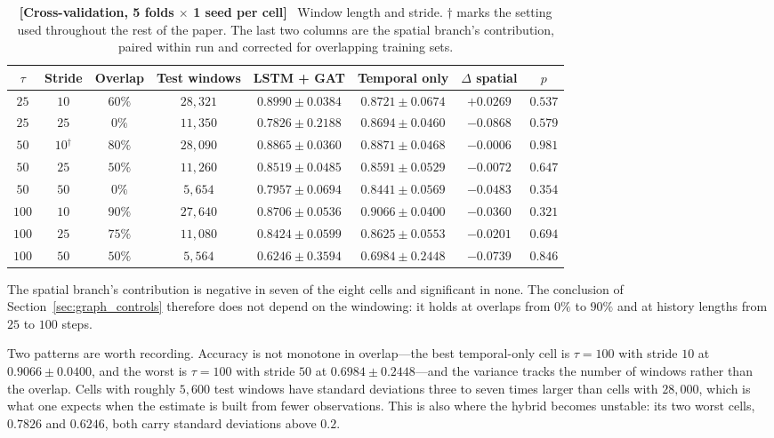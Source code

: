 \documentclass[journal]{IEEEtran}
\begin{document}
\begin{table}[!t]
  \centering
  \caption{\textbf{[Cross-validation, 5 folds $\times$ 1 seed per cell]}~
  Window length and stride. $\dagger$ marks the setting used throughout the
  rest of the paper. The last two columns are the spatial branch's
  contribution, paired within run and corrected for overlapping training sets.}
  \label{tab:window_stride}
  \renewcommand{\arraystretch}{1.2}
  \footnotesize
  \setlength{\tabcolsep}{4pt}
  \begin{tabular}{@{}cccccccc@{}}
    \toprule
    $\tau$ & \textbf{Stride} & \textbf{Overlap} & \textbf{Test windows}
    & \textbf{LSTM + GAT} & \textbf{Temporal only}
    & \textbf{$\Delta$ spatial} & \textbf{$p$} \\ \midrule
    $25$ & $10$ & $60\%$ & $28{,}321$ & $0.8990 \pm 0.0384$ & $0.8721 \pm 0.0674$ & $+0.0269$ & $0.537$ \\
    $25$ & $25$ & $0\%$ & $11{,}350$ & $0.7826 \pm 0.2188$ & $0.8694 \pm 0.0460$ & $-0.0868$ & $0.579$ \\
    $50$ & $10$$^{\dagger}$ & $80\%$ & $28{,}090$ & $0.8865 \pm 0.0360$ & $0.8871 \pm 0.0468$ & $-0.0006$ & $0.981$ \\
    $50$ & $25$ & $50\%$ & $11{,}260$ & $0.8519 \pm 0.0485$ & $0.8591 \pm 0.0529$ & $-0.0072$ & $0.647$ \\
    $50$ & $50$ & $0\%$ & $5{,}654$ & $0.7957 \pm 0.0694$ & $0.8441 \pm 0.0569$ & $-0.0483$ & $0.354$ \\
    $100$ & $10$ & $90\%$ & $27{,}640$ & $0.8706 \pm 0.0536$ & $0.9066 \pm 0.0400$ & $-0.0360$ & $0.321$ \\
    $100$ & $25$ & $75\%$ & $11{,}080$ & $0.8424 \pm 0.0599$ & $0.8625 \pm 0.0553$ & $-0.0201$ & $0.694$ \\
    $100$ & $50$ & $50\%$ & $5{,}564$ & $0.6246 \pm 0.3594$ & $0.6984 \pm 0.2448$ & $-0.0739$ & $0.846$ \\
    \bottomrule
  \end{tabular}
\end{table}

The spatial branch's contribution is negative in seven of the eight cells and
significant in none. The conclusion of Section~\ref{sec:graph_controls}
therefore does not depend on the windowing: it holds at overlaps from $0\%$ to
$90\%$ and at history lengths from $25$ to $100$ steps.

Two patterns are worth recording. Accuracy is not monotone in overlap---the
best temporal-only cell is $\tau = 100$ with stride $10$ at
$0.9066 \pm 0.0400$, and the worst is $\tau = 100$ with stride $50$ at
$0.6984 \pm 0.2448$---and the variance tracks the number of windows rather
than the overlap. Cells with roughly $5{,}600$ test windows have standard
deviations three to seven times larger than cells with $28{,}000$, which is
what one expects when the estimate is built from fewer observations. This is
also where the hybrid becomes unstable: its two worst cells, $0.7826$ and
$0.6246$, both carry standard deviations above $0.2$.
\end{document}
